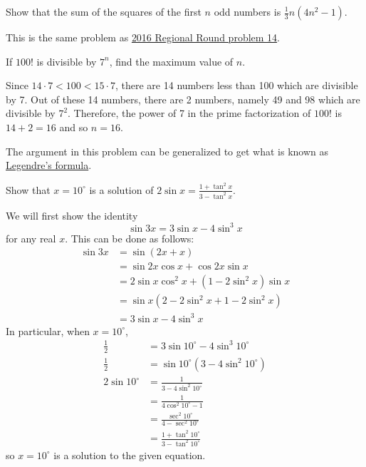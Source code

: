\begin{question}
    Show that the sum of the squares of the first $n$ odd numbers is
    $\frac{1}{3}n(4n^2 - 1)$.
\end{question}
\begin{solution}
    This is the same problem as \hyperref[sol: 2016 Regional Round P14]{2016
    Regional Round problem 14}. 
\end{solution}

\begin{question}
    If $100!$ is divisible by $7^{n}$, find the maximum value of $n$. 
\end{question}
\begin{solution}
    Since $14 \cdot 7 < 100 < 15 \cdot 7$, there are 14 numbers less than 100
    which are divisible by 7. Out of these 14 numbers, there are 2 numbers,
    namely 49 and 98 which are divisible by $7^2$. Therefore, the power of 7 in
    the prime factorization of $100!$ is $14 + 2 = 16$ and so $n = 16$.
\end{solution}
\begin{remark}
    The argument in this problem can be generalized to get what is known as
\href{https://en.wikipedia.org/wiki/Legendre%27s_formula}{Legendre's formula}.
\end{remark}

\begin{question}
    Show that $x = 10^\circ$ is a solution of $2\sin x=\frac{1 + \tan^2x}{3 -
    \tan^2x}$.
\end{question}
\begin{solution}
    We will first show the identity
    \[ \sin 3x = 3\sin x - 4\sin^3 x \]
    for any real $x$. This can be done as follows:
    \begin{align*}
        \sin 3x &= \sin(2x + x)\\
        &= \sin 2x \cos x + \cos 2x \sin x\\
        &= 2\sin x \cos^2 x + (1 - 2\sin^2 x)\sin x\\
        &= \sin x (2 - 2\sin^2 x + 1 - 2\sin^2 x)\\
        &= 3\sin x - 4\sin^3 x
    \end{align*}
    In particular, when $x = 10^\circ$,
    \begin{align*} 
        \frac{1}{2} &= 3\sin 10^\circ - 4\sin^3 10^\circ\\
        \frac{1}{2} &= \sin 10^\circ (3 - 4\sin^2 10^\circ)\\
        2 \sin 10^\circ &= \frac{1}{3 - 4\sin^2 10^\circ}\\
        &= \frac{1}{4\cos^2 10^\circ - 1}\\
        &= \frac{\sec^2 10^\circ}{4 - \sec^2 10^\circ}\\
        &= \frac{1 + \tan^2 10^\circ}{3 - \tan^2 10^\circ}
    \end{align*}
    so $x = 10^\circ$ is a solution to the given equation.
\end{solution}

